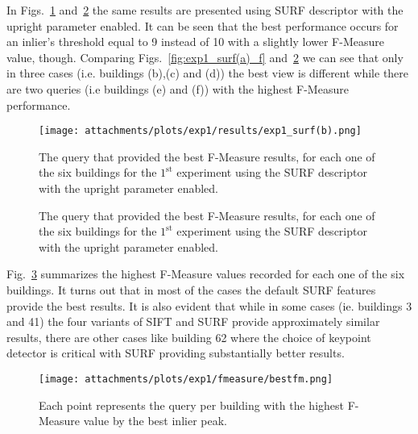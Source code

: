	  In Figs.~\ref{fig:exp1_surf_b} and~\ref{fig:exp1_surf(b)_f} the same results are presented using SURF descriptor with the upright parameter enabled.
	  It can be seen that the best performance occurs for an inlier’s threshold equal to 9 instead of 10 with a slightly lower F-Measure value, though. Comparing Figs.~\ref{fig:exp1_surf(a)_f} and~\ref{fig:exp1_surf(b)_f} we can see that only
	  in three cases (i.e. buildings (b),(c) and (d)) the best view is different while there
	  are two queries (i.e buildings (e) and (f)) with the highest F-Measure performance.
	  \newpage
	  
	  \begin{figure}[ht!] %
	    \centering
	    \texttt{[image: attachments/plots/exp1/results/exp1\_surf(b).png]}
	    \caption{The query that provided the best F-Measure results, for each one of the six buildings for the $1^\text{st}$ experiment using the SURF descriptor with the upright parameter enabled.}
	    \label{fig:exp1_surf_b}
	  \end{figure}

	  \begin{figure}[H] 
		  \centering
		  
		  \caption{The query that provided the best F-Measure results, for each one of the six buildings for the $1^\text{st}$  experiment using the SURF descriptor with the upright parameter enabled.}
		  \label{fig:exp1_surf(b)_f}
	      \end{figure}
	    \newpage
	    
	    Fig.~\ref{fig:exp1_bestfm} summarizes the highest F-Measure values recorded for each one of the six buildings. It turns out that in most of the cases the default SURF features provide the best results. It is also evident that while in some cases (ie. buildings 3 and 41) the four variants of SIFT and SURF provide approximately similar results, there are other cases like building 62 where the choice of keypoint detector is critical with SURF providing substantially better results.
	    \begin{figure}[ht!] %
              \centering
              \texttt{[image: attachments/plots/exp1/fmeasure/bestfm.png]}
              \caption{Each point represents the query per building with the highest F-Measure value by the best inlier peak.}
              \label{fig:exp1_bestfm}
            \end{figure}
      
